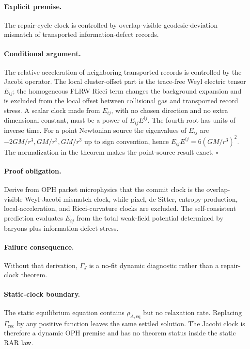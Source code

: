 \documentclass[11pt]{article}
\begin{document}
\paragraph{Explicit premise.}
The repair-cycle clock is controlled by overlap-visible geodesic-deviation
mismatch of transported information-defect records.

\paragraph{Conditional argument.}
The relative acceleration of neighboring transported records is controlled by
the Jacobi operator.  The local cluster-offset part is the trace-free Weyl
electric tensor \(E_{ij}\); the homogeneous FLRW Ricci term changes the
background expansion and is excluded from the local offset between collisional
gas and transported record stress.  A scalar clock made from \(E_{ij}\), with no
chosen direction and no extra dimensional constant, must be a power of
\(E_{ij}E^{ij}\).  The fourth root has units of inverse time.  For a point
Newtonian source the eigenvalues of \(E_{ij}\) are
\(-2GM/r^3,GM/r^3,GM/r^3\) up to sign convention, hence
\(E_{ij}E^{ij}=6(GM/r^3)^2\).  The normalization in the theorem makes the
point-source result exact. \(\square\)

\paragraph{Proof obligation.}
Derive from OPH packet microphysics that the commit clock is the
overlap-visible Weyl-Jacobi mismatch clock, while pixel, de Sitter,
entropy-production, local-acceleration, and Ricci-curvature clocks are
excluded.  The
self-consistent prediction evaluates \(E_{ij}\) from the total weak-field
potential determined by baryons plus information-defect stress.

\paragraph{Failure consequence.}
Without that derivation, \(\Gamma_J\) is a no-fit dynamic diagnostic rather
than a repair-clock theorem.

\paragraph{Static-clock boundary.}
The static equilibrium equation contains \(\rho_{A,\mathrm{eq}}\) but no
relaxation rate.  Replacing \(\Gamma_{\mathrm{rec}}\) by any positive function
leaves the same settled solution.  The Jacobi clock is therefore a dynamic
OPH premise and has no theorem status inside the static RAR law.
\end{document}
